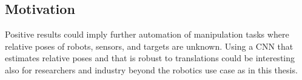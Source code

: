 \subsection{Motivation}

Positive results could imply further automation of manipulation tasks where
relative poses of robots, sensors, and targets are unknown. Using a CNN that
estimates relative poses and that is robust to translations could be
interesting also for researchers and industry beyond the robotics use case as
in this thesis.
